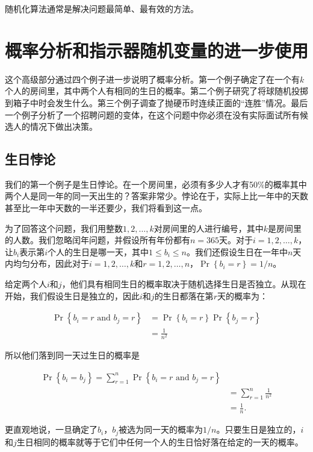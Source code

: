\documentclass[lang=cn,newtx,10pt,scheme=chinese]{elegantbook}
\begin{document}
随机化算法通常是解决问题最简单、最有效的方法。

\section{概率分析和指示器随机变量的进一步使用}\label{section-5.4}

这个高级部分通过四个例子进一步说明了概率分析。第一个例子确定了在一个有$k$个人的房间里，其中两个人有相同的生日的概率。第二个例子研究了将球随机投掷到箱子中时会发生什么。第三个例子调查了抛硬币时连续正面的“连胜”情况。最后一个例子分析了一个招聘问题的变体，在这个问题中你必须在没有实际面试所有候选人的情况下做出决策。

\subsection{生日悖论}

我们的第一个例子是生日悖论。在一个房间里，必须有多少人才有50\%的概率其中两个人是同一年的同一天出生的？答案非常少。悖论在于，实际上比一年中的天数甚至比一年中天数的一半还要少，我们将看到这一点。

为了回答这个问题，我们用整数$1,2,\ldots,k$对房间里的人进行编号，其中$k$是房间里的人数。我们忽略闰年问题，并假设所有年份都有$n=365$天。对于$i=1,2,\ldots,k$，让$b_i$表示第$i$个人的生日是哪一天，其中$1\leq b_i\leq n$。我们还假设生日在一年中$n$天内均匀分布，因此对于$i=1,2,\ldots,k$和$r=1,2,\ldots,n$，$\operatorname{Pr}\left\{b_i=r\right\}=1/n$。

给定两个人$i$和$j$，他们具有相同生日的概率取决于随机选择生日是否独立。从现在开始，我们假设生日是独立的，因此$i$和$j$的生日都落在第$r$天的概率为：

$$
\begin{aligned}
\operatorname{Pr}\left\{b_i=r \text { and } b_j=r\right\} & =\operatorname{Pr}\left\{b_i=r\right\} \operatorname{Pr}\left\{b_j=r\right\} \\
& =\frac{1}{n^2}
\end{aligned}
$$

所以他们落到同一天过生日的概率是

$$
\begin{aligned}
\operatorname{Pr}\left\{b_i=b_j\right\}=\sum_{r=1}^n \operatorname{Pr}\left\{b_i=r \text { and } b_j=r\right\} \\
& =\sum_{r=1}^n \frac{1}{n^2} \\
& =\frac{1}{n} .
\end{aligned}
$$

更直观地说，一旦确定了$b_i$，$b_j$被选为同一天的概率为$1/n$。只要生日是独立的，$i$和$j$生日相同的概率就等于它们中任何一个人的生日恰好落在给定的一天的概率。
\end{document}
